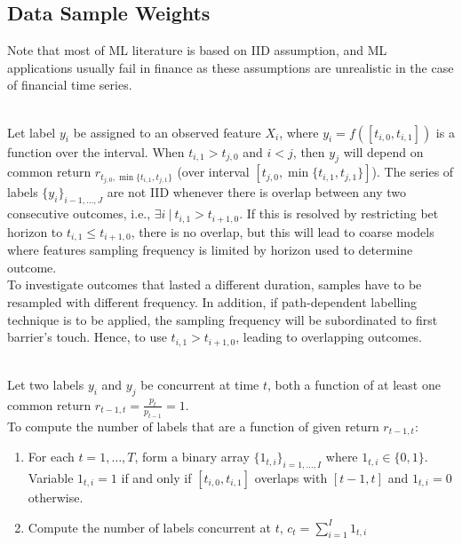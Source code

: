 \subsection{Data Sample Weights}

Note that most of ML literature is based on IID assumption, and ML applications usually fail in finance as these assumptions are unrealistic in the case of financial time series.

\begin{remark} \\
Let label $y_i$ be assigned to an observed feature $X_i$, where $y_i = f([t_{i,0}, t_{i,1}])$ is a function over the interval. When $t_{i,1} > t_{j,0}$ and $i < j$, then $y_j$ will depend on common return $r_{t_{j,0}, \min\{t_{i,1}, t_{j,1}\}}$ (over interval $[t_{j,0}, \min\{t_{i,1}, t_{j,1}\}]$). The series of labels $\{y_i \}_{i-1, \ldots, J}$ are not IID whenever there is overlap between any two consecutive outcomes, i.e., $\exists i \ \vert \ t_{i,1} > t_{i+1, 0}$. If this is resolved by restricting bet horizon to $t_{i,1} \leq t_{i+1, 0}$, there is no overlap, but this will lead to coarse models where features sampling frequency is limited by horizon used to determine outcome.\\
To investigate outcomes that lasted a different duration, samples have to be resampled with different frequency. In addition, if path-dependent labelling technique is to be applied, the sampling frequency will be subordinated to first barrier's touch. Hence, to use $t_{i,1} > t_{i+1, 0}$, leading to overlapping outcomes.
\end{remark}

\begin{method} \\
Let two labels $y_i$ and $y_j$ be concurrent at time $t$, both a function of at least one common return $r_{t-1, t} = \frac{p_t}{p_{t-1}} = 1$.\\
To compute the number of labels that are a function of given return $r_{t-1, t}$:
\begin{enumerate}[label=\roman*.]
\setlength{\itemsep}{0pt}
\item For each $t = 1, \ldots, T$, form a binary array $\{1_{t,i}\}_{i=1, \ldots, I}$ where $1_{t, i} \in \{0,1 \}$.\\
Variable $1_{t,i} = 1$ if and only if $[t_{i,0}, t_{i,1}]$ overlaps with $[t-1, t]$ and $1_{t,i}=0$ otherwise.
\item Compute the number of labels concurrent at $t$, $c_t = \sum\limits_{i=1}^I 1_{t,i}$
\end{enumerate}
\end{method}


